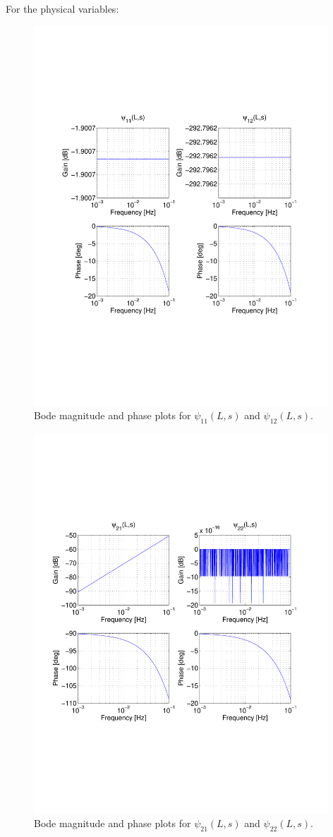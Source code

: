 \documentclass[preprint]{elsarticle}
\begin{document}
For the physical variables: 
\begin{figure}[H]
\centering
\includegraphics[trim = 0mm 60mm 0mm 60mm, width = 110mm]{IOv_-3to-1}
\caption{Bode magnitude and phase plots for $\psi_{11}(L,s)$ and $\psi_{12}(L,s)$.}
\end{figure}

\begin{figure}[H]
\centering
\includegraphics[trim = 0mm 60mm 0mm 60mm, width = 110mm]{IOq_-3to-1}
\caption{Bode magnitude and phase plots for $\psi_{21}(L,s)$ and $\psi_{22}(L,s)$.}
\end{figure}
\end{document}
